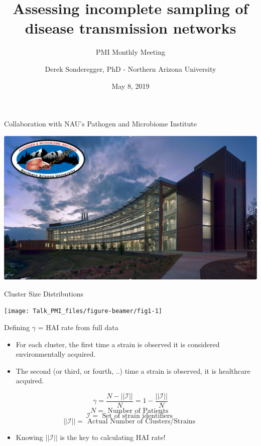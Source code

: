 \documentclass[ignorenonframetext,]{beamer}
\title{Assessing incomplete sampling of disease transmission networks}
\subtitle{PMI Monthly Meeting}
\author{Derek Sonderegger, PhD - Northern Arizona University}
\date{May 8, 2019}
\providecommand{\tightlist}{%
  \setlength{\itemsep}{0pt}\setlength{\parskip}{0pt}}
\begin{document}
\frame{\titlepage}

\begin{frame}{Collaboration with NAU's Pathogen and Microbiome
Institute}
\protect\hypertarget{collaboration-with-naus-pathogen-and-microbiome-institute}{}

\begin{center}\includegraphics[width=600px]{Images/ARD&PMI} \end{center}

\end{frame}

\begin{frame}{Cluster Size Distributions}
\protect\hypertarget{cluster-size-distributions}{}

\begin{center}\texttt{[image: Talk\_PMI\_files/figure-beamer/fig1-1]} \end{center}

\end{frame}

\begin{frame}{Defining \(\gamma\) = HAI rate from full data}
\protect\hypertarget{defining-gamma-hai-rate-from-full-data}{}

\begin{itemize}
\tightlist
\item
  For each cluster, the first time a strain is observed it is considered
  environmentally acquired.
\item
  The second (or third, or fourth, ..) time a strain is observed, it is
  healthcare acquired.
\end{itemize}

\[ \gamma = \frac{N - ||\mathcal{I}||}{N} = 1 - \frac{||\mathcal{I}||}{N}\]
\[ N = \textrm{ Number of Patients }\]
\[\mathcal{I} = \textrm{ Set of strain identifiers }\]
\[||\mathcal{I}|| = \textrm{ Actual Number of Clusters/Strains }\]

\begin{itemize}
\tightlist
\item
  Knowing \(||\mathcal{I}||\) is the key to calculating HAI rate!
\end{itemize}

\end{frame}
\end{document}
